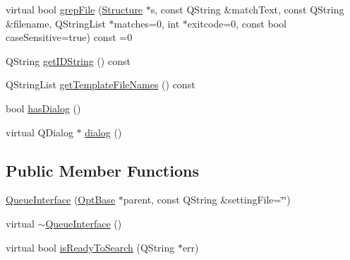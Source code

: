 \begin{DoxyCompactItemize}
\item 
virtual bool \hyperlink{classGlobalSearch_1_1QueueInterface_ad3a350e2b2cd0ac746b3c3c22e8606a5}{grep\-File} (\hyperlink{classGlobalSearch_1_1Structure}{Structure} $\ast$s, const Q\-String \&match\-Text, const Q\-String \&filename, Q\-String\-List $\ast$matches=0, int $\ast$exitcode=0, const bool case\-Sensitive=true) const =0
\item 
Q\-String \hyperlink{classGlobalSearch_1_1QueueInterface_a105fbf7ab1565d55cae260269d4be627}{get\-I\-D\-String} () const 
\item 
Q\-String\-List \hyperlink{classGlobalSearch_1_1QueueInterface_a1208dba4232727cc026efdf7423f29ad}{get\-Template\-File\-Names} () const 
\item 
bool \hyperlink{group__dialog_gaa78e95fa76777efba3cdfd70d8e3caf9}{has\-Dialog} ()
\item 
virtual Q\-Dialog $\ast$ \hyperlink{group__dialog_ga4457d66b93f0406af1b595659ca25dcf}{dialog} ()
\end{DoxyCompactItemize}
\subsection*{Public Member Functions}
\begin{DoxyCompactItemize}
\item 
\hyperlink{classGlobalSearch_1_1QueueInterface_a77760aeacabb67669a1a32cf3355d472}{Queue\-Interface} (\hyperlink{classGlobalSearch_1_1OptBase}{Opt\-Base} $\ast$parent, const Q\-String \&setting\-File=\char`\"{}\char`\"{})
\item 
virtual \hyperlink{classGlobalSearch_1_1QueueInterface_a3e27228ce5719de17a5fabe8c105d174}{$\sim$\-Queue\-Interface} ()
\item 
virtual bool \hyperlink{classGlobalSearch_1_1QueueInterface_a5da91bc3cd0c30e9a3c7259aada7b5f9}{is\-Ready\-To\-Search} (Q\-String $\ast$err)
\end{DoxyCompactItemize}
